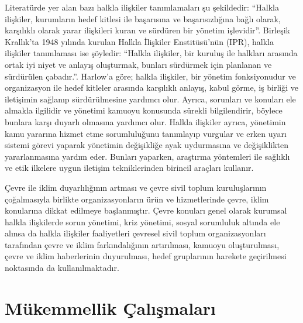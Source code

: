 \documentclass[
]{book}
\begin{document}
Literatürde yer alan bazı halkla ilişkiler tanımlamaları şu şekildedir: ``Halkla ilişkiler, kurumların hedef kitlesi ile başarısına ve başarısızlığına bağlı olarak, karşılıklı olarak yarar ilişkileri kuran ve sürdüren bir yönetim işlevidir''. \citep{broom2013cutlip} Birleşik Krallık'ta 1948 yılında kurulan Halkla İlişkiler Enstitüsü'nün (IPR), halkla ilişkiler tanımlaması ise şöyledir: ``Halkla ilişkiler, bir kuruluş ile halkları arasında ortak iyi niyet ve anlayış oluşturmak, bunları sürdürmek için planlanan ve sürdürülen çabadır.''.\citep{theaker2016public} Harlow'a göre; halkla ilişkiler, bir yönetim fonksiyonudur ve organizasyon ile hedef kitleler arasında karşılıklı anlayış, kabul görme, iş birliği ve iletişimin sağlanıp sürdürülmesine yardımcı olur. Ayrıca, sorunları ve konuları ele almakla ilgilidir ve yönetimi kamuoyu konusunda sürekli bilgilendirir, böylece bunlara karşı duyarlı olmasına yardımcı olur. Halkla ilişkiler ayrıca, yönetimin kamu yararına hizmet etme sorumluluğunu tanımlayıp vurgular ve erken uyarı sistemi görevi yaparak yönetimin değişikliğe ayak uydurmasına ve değişiklikten yararlanmasına yardım eder. Bunları yaparken, araştırma yöntemleri ile sağlıklı ve etik ilkelere uygun iletişim tekniklerinden birincil araçları kullanır.\citep{yalim2012kentlerde}

Çevre ile iklim duyarlılığının artması ve çevre sivil toplum kuruluşlarının çoğalmasıyla birlikte organizasyonların ürün ve hizmetlerinde çevre, iklim konularına dikkat edilmeye başlanmıştır. Çevre konuları genel olarak kurumsal halkla ilişkilerde sorun yönetimi, kriz yönetimi, sosyal sorumluluk altında ele alınsa da halkla ilişkiler faaliyetleri çevresel sivil toplum organizasyonları tarafından çevre ve iklim farkındalığının artırılması, kamuoyu oluşturulması, çevre ve iklim haberlerinin duyurulması, hedef gruplarının harekete geçirilmesi noktasında da kullanılmaktadır.

\hypertarget{muxfckemmellik-uxe7alux131ux15fmalarux131}{%
\section{Mükemmellik Çalışmaları}\label{muxfckemmellik-uxe7alux131ux15fmalarux131}}
\end{document}

